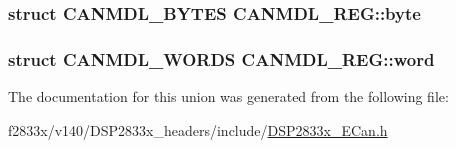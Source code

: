 \subsubsection[{byte}]{\setlength{\rightskip}{0pt plus 5cm}struct {\bf C\+A\+N\+M\+D\+L\+\_\+\+B\+Y\+T\+E\+S} C\+A\+N\+M\+D\+L\+\_\+\+R\+E\+G\+::byte}\label{union_c_a_n_m_d_l___r_e_g_a5683472ee6355778e87cc820a29a22b1}
\hypertarget{union_c_a_n_m_d_l___r_e_g_aec3bd76f4220341514d3cfaad6eb2920}{}
\subsubsection[{word}]{\setlength{\rightskip}{0pt plus 5cm}struct {\bf C\+A\+N\+M\+D\+L\+\_\+\+W\+O\+R\+D\+S} C\+A\+N\+M\+D\+L\+\_\+\+R\+E\+G\+::word}\label{union_c_a_n_m_d_l___r_e_g_aec3bd76f4220341514d3cfaad6eb2920}


The documentation for this union was generated from the following file\+:\begin{DoxyCompactItemize}
\item 
f2833x/v140/\+D\+S\+P2833x\+\_\+headers/include/\hyperlink{_d_s_p2833x___e_can_8h}{D\+S\+P2833x\+\_\+\+E\+Can.\+h}\end{DoxyCompactItemize}
